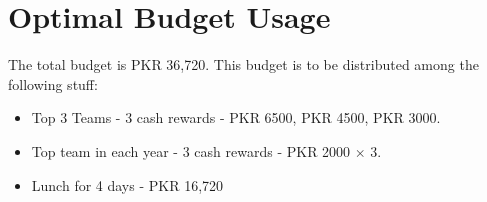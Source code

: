 \documentclass[12pt]{article}
\begin{document}
\section*{\centering Optimal Budget Usage}
The total budget is PKR 36,720.
This budget is to be distributed among the following stuff:
\begin{itemize}
    \item Top 3 Teams - 3 cash rewards - PKR 6500, PKR 4500, PKR 3000.
    \item Top team in each year - 3 cash rewards - PKR 2000 $\times$ 3.
    \item Lunch for 4 days - PKR 16,720
\end{itemize}
\end{document}
